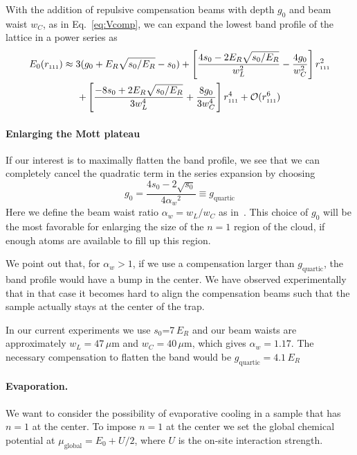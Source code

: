 \documentclass[11pt,letter]{article}
\newcommand{\rdiag}{\ensuremath{ r_{\text{\tiny{111}}} } }
\newcommand{\awaist}{\ensuremath{ \alpha_{w} }}
\begin{document}
With the addition of repulsive compensation beams with depth $g_{0}$ and beam
waist $w_{C}$,  as in Eq.~\ref{eq:Vcomp},  we can expand the lowest band
profile of the lattice in a power series as  
\begin{multline} 
  E_{0}(\rdiag)    \approx   
  3( g_{0} + E_{R}\sqrt{s_{0}/E_{R}} - s_{0} )   
  + \left[ 
    \frac{ 4s_{0} - 2E_{R}\sqrt{s_{0}/E_{R}} }{w_{L}^{2} } 
   - 
  \frac{ 4 g_{0} }{ w_{C}^{2}} \right]
  \rdiag^{2}  \\ 
  +  \left[  \frac{ - 8 s_{0} + 2E_{R}\sqrt{s_{0}/E_{R}} }{3 w_{L}^{4} } + 
    \frac{ 8 g_{0} }{3 w_{C}^{4} }  \right] \rdiag^{4}   + 
  \mathcal{O}( \rdiag^{6} )
\end{multline}  

\paragraph{Enlarging the Mott plateau} 
If our interest is to maximally flatten the band profile, we see that we can
completely cancel the quadratic term in the series expansion by choosing 
\begin{equation}
 g_{0} = \frac{  4 s_{0} - 2 \sqrt{s_{0}} }{ 4 \awaist^{2} }  
  \equiv g_{\text{quartic}} 
\end{equation}
Here we define  the beam waist ratio $\awaist = w_{L}/w_{C}$ as
in~\cite{Mathy2012}.  This choice of $g_{0}$ will be the most favorable for
enlarging the size of the $n=1$ region of the cloud,  if enough atoms are
available to fill up this region. 
 
We point out that, for $\awaist > 1$,  if we use a compensation larger than
$g_{\text{quartic}}$, the band profile would have a bump in the center.  We
have observed experimentally that in that case it becomes hard to align the
compensation beams such that the sample actually stays at the center of the
trap.

In our current experiments we use $s_{0}$=7\,$E_{R}$ and our beam waists are
approximately $w_{L}=47\,\mu$m and $w_{C}=40\,\mu$m, which gives
$\awaist=1.17$.  The necessary compensation to flatten the band would be
$g_{\text{quartic}} =  4.1\,E_{R}$




\paragraph{Evaporation.} We want to consider the possibility of evaporative
cooling in a sample that has $n=1$ at the center.  To impose $n=1$ at the
center we set the global chemical potential
at $\mu_{\text{global}} = E_{0} + U/2$, where $U$ is the
on-site interaction strength.   
\end{document}
